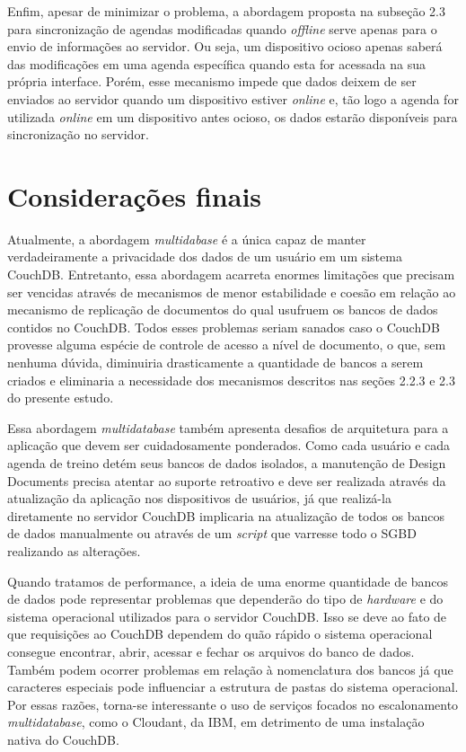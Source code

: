 \documentclass[
	article,			%
	12pt,				%
	oneside,			%
	a4paper,			%
	english,			%
	brazil,				%
	sumario=tradicional
	]{abntex2}
\begin{document}
Enfim, apesar de minimizar o problema, a abordagem proposta na subseção 2.3 para sincronização de agendas modificadas quando \textit{offline} serve apenas para o envio de informações ao servidor. Ou seja, um dispositivo ocioso apenas saberá das modificações em uma agenda específica quando esta for acessada na sua própria interface. Porém, esse mecanismo impede que dados deixem de ser enviados ao servidor quando um dispositivo estiver \textit{online} e, tão logo a agenda for utilizada \textit{online} em um dispositivo antes ocioso, os dados estarão disponíveis para sincronização no servidor.

\section*{Considerações finais}

Atualmente, a abordagem \textit{multidabase} é a única capaz de manter verdadeiramente a privacidade dos dados de um usuário em um sistema CouchDB. Entretanto, essa abordagem acarreta enormes limitações que precisam ser vencidas através de mecanismos de menor estabilidade e coesão em relação ao mecanismo de replicação de documentos do qual usufruem os bancos de dados contidos no CouchDB. Todos esses problemas seriam sanados caso o CouchDB provesse alguma espécie de controle de acesso a nível de documento, o que, sem nenhuma dúvida, diminuiria drasticamente a quantidade de bancos a serem criados e eliminaria a necessidade dos mecanismos descritos nas seções 2.2.3 e 2.3 do presente estudo.

Essa abordagem \textit{multidatabase} também apresenta desafios de arquitetura para a aplicação que devem ser cuidadosamente ponderados. Como cada usuário e cada agenda de treino detém seus bancos de dados isolados, a manutenção de Design Documents precisa atentar ao suporte retroativo e deve ser realizada através da atualização da aplicação nos dispositivos de usuários, já que realizá-la diretamente no servidor CouchDB implicaria na atualização de todos os bancos de dados manualmente ou através de um \textit{script} que varresse todo o SGBD realizando as alterações.

Quando tratamos de performance, a ideia de uma enorme quantidade de bancos de dados pode representar problemas que dependerão do tipo de \textit{hardware} e do sistema operacional utilizados para o servidor CouchDB. Isso se deve ao fato de que requisições ao CouchDB dependem do quão rápido o sistema operacional consegue encontrar, abrir, acessar e fechar os arquivos do banco de dados. Também podem ocorrer problemas em relação à nomenclatura dos bancos já que caracteres especiais pode influenciar a estrutura de pastas do sistema operacional. Por essas razões, torna-se interessante o uso de serviços focados no escalonamento \textit{multidatabase}, como o Cloudant, da IBM, em detrimento de uma instalação nativa do CouchDB.
\end{document}
